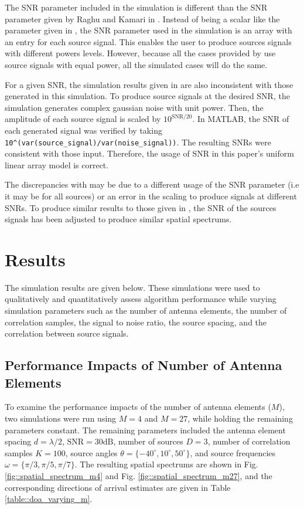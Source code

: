 \documentclass[conference]{IEEEtran}
\begin{document}
		The SNR parameter included in the simulation is different than the SNR parameter given by Raghu and Kamari in \cite{doa_algorithms_raghu}. Instead of being a scalar like the parameter given in \cite{doa_algorithms_raghu}, the SNR parameter used in the simulation is an array with an entry for each source signal. This enables the user to produce sources signals with different powers levels. However, because all the cases provided by \cite{doa_algorithms_raghu} use source signals with equal power, all the simulated cases will do the same.
		
		For a given SNR, the simulation results given in \cite{doa_algorithms_raghu} are also inconsistent with those generated in this simulation. To produce source signals at the desired SNR, the simulation generates complex gaussian noise with unit power. Then, the amplitude of each source signal is scaled by $10^{\text{SNR}/20}$. In MATLAB, the SNR of each generated signal was verified by taking \texttt{10\^{}(var(source\_signal)/var(noise\_signal))}. The resulting SNRs were consistent with those input. Therefore, the usage of SNR in this paper's uniform linear array model is correct. 
		
		The discrepancies with \cite{doa_algorithms_raghu} may be due to a different usage of the SNR parameter (i.e it may be for all sources) or an error in the scaling to produce signals at different SNRs. To produce similar results to those given in \cite{doa_algorithms_raghu}, the SNR of the sources signals has been adjusted to produce similar spatial spectrums.
		
	\section{Results}
	
		The simulation results are given below. These simulations were used to qualitatively and quantitatively assess algorithm performance while varying simulation parameters such as the number of antenna elements, the number of correlation samples, the signal to noise ratio, the source spacing, and the correlation between source signals.
		
		\subsection{Performance Impacts of Number of Antenna Elements}
		
		To examine the performance impacts of the number of antenna elements ($M$), two simulations were run using $M = 4$ and $M=27$, while holding the remaining parameters constant. The remaining parameters included the antenna element spacing $d = \lambda/2$, $\text{SNR}=30\text{dB}$, number of sources $D=3$, number of correlation samples $K=100$, source angles $\theta = \{-40^{\circ}, 10^{\circ}, 50^{\circ}\}$, and source frequencies $\omega = \{\pi/3, \pi/5, \pi/7\}$. The resulting spatial spectrums are shown in Fig. \ref{fig::spatial_spectrum_m4} and Fig. \ref{fig::spatial_spectrum_m27}, and the corresponding directions of arrival estimates are given in Table \ref{table::doa_varying_m}.
		
\end{document}
